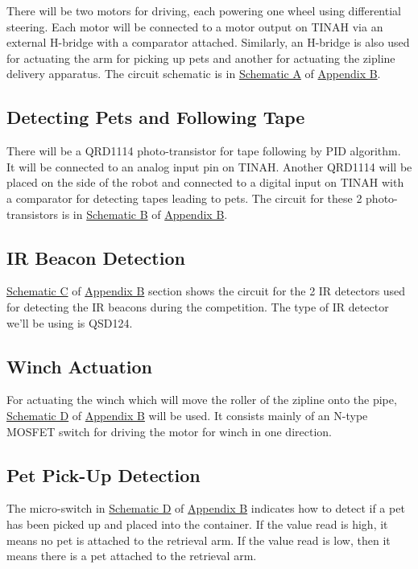 \documentclass[11pt, oneside]{article} %
\begin{document}
	There will be two motors for driving, each powering one wheel using differential steering. Each motor will be connected to a motor output on TINAH via an external H-bridge with a comparator attached. Similarly, an H-bridge is also used for actuating the arm for picking up pets and another for actuating the zipline delivery apparatus. The circuit schematic is in \hyperref[sch:A]{Schematic A} of \hyperref[appendixB]{Appendix B}.
	
	\subsection{Detecting Pets and Following Tape}
	
	There will be a QRD1114 photo-transistor for tape following by PID algorithm. It will be connected to an analog input pin on TINAH. Another QRD1114 will be placed on the side of the robot and connected to a digital input on TINAH with a comparator for detecting tapes leading to pets. The circuit for these 2 photo-transistors is in \hyperref[sch:B]{Schematic B} of \hyperref[appendixB]{Appendix B}. 
	
	\subsection{IR Beacon Detection}
	
	\hyperref[sch:C]{Schematic C} of \hyperref[appendixB]{Appendix B} section shows the circuit for the 2 IR detectors used for detecting the IR beacons during the competition. The type of IR detector we'll be using is QSD124. 
	
	\subsection{Winch Actuation}
	
	For actuating the winch which will move the roller of the zipline onto the pipe, \hyperref[sch:D]{Schematic D} of \hyperref[appendixB]{Appendix B} will be used. It consists mainly of an N-type MOSFET switch for driving the motor for winch in one direction. 
	
	\subsection{Pet Pick-Up Detection}
	
	The micro-switch in \hyperref[sch:E]{Schematic D} of \hyperref[appendixB]{Appendix B} indicates how to detect if a pet has been picked up and placed into the container. If the value read is high, it means no pet is attached to the retrieval arm. If the value read is low, then it means there is a pet attached to the retrieval arm. 
	
\end{document}
